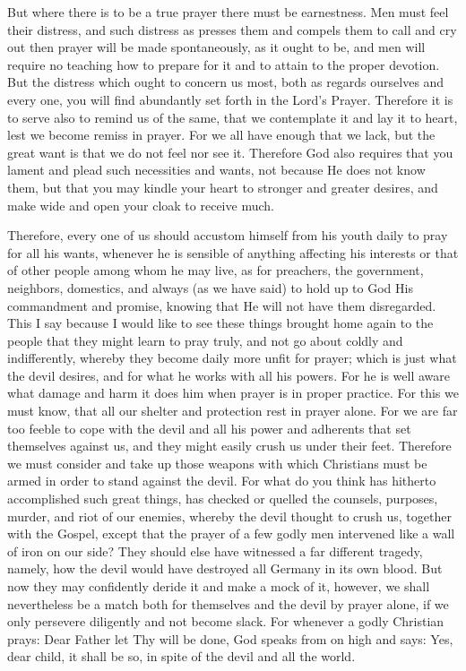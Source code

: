But where there is to be a true prayer there must be earnestness. Men
must feel their distress, and such distress as presses them and compels
them to call and cry out then prayer will be made spontaneously, as it
ought to be, and men will require no teaching how to prepare for it and
to attain to the proper devotion. But the distress which ought to
concern us most, both as regards ourselves and every one, you will find
abundantly set forth in the Lord's Prayer. Therefore it is to serve
also to remind us of the same, that we contemplate it and lay it to
heart, lest we become remiss in prayer. For we all have enough that we
lack, but the great want is that we do not feel nor see it. Therefore
God also requires that you lament and plead such necessities and wants,
not because He does not know them, but that you may kindle your heart
to stronger and greater desires, and make wide and open your cloak to
receive much.

Therefore, every one of us should accustom himself from his youth
daily to pray for all his wants, whenever he is sensible of anything
affecting his interests or that of other people among whom he may live,
as for preachers, the government, neighbors, domestics, and always (as
we have said) to hold up to God His commandment and promise, knowing
that He will not have them disregarded. This I say because I would like
to see these things brought home again to the people that they might
learn to pray truly, and not go about coldly and indifferently, whereby
they become daily more unfit for prayer; which is just what the devil
desires, and for what he works with all his powers. For he is well
aware what damage and harm it does him when prayer is in proper
practice. For this we must know, that all our shelter and protection
rest in prayer alone. For we are far too feeble to cope with the devil
and all his power and adherents that set themselves against us, and
they might easily crush us under their feet. Therefore we must consider
and take up those weapons with which Christians must be armed in order
to stand against the devil. For what do you think has hitherto
accomplished such great things, has checked or quelled the counsels,
purposes, murder, and riot of our enemies, whereby the devil thought to
crush us, together with the Gospel, except that the prayer of a few
godly men intervened like a wall of iron on our side? They should else
have witnessed a far different tragedy, namely, how the devil would
have destroyed all Germany in its own blood. But now they may
confidently deride it and make a mock of it, however, we shall
nevertheless be a match both for themselves and the devil by prayer
alone, if we only persevere diligently and not become slack. For
whenever a godly Christian prays: Dear Father let Thy will be done, God
speaks from on high and says: Yes, dear child, it shall be so, in spite
of the devil and all the world.


